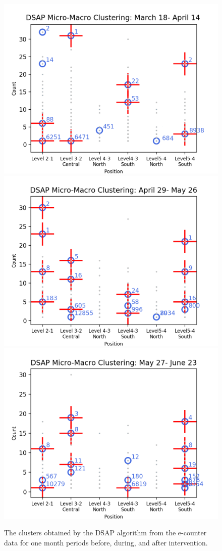\begin{figure}[!t]
    \centering
    \includegraphics[width=.47\textwidth]{image/Chapters/Chapter6/BeforeInte1month.png}
    \includegraphics[width=.47\textwidth]{image/Chapters/Chapter6/duringInte1month.png}
    \includegraphics[width=.47\textwidth]{image/Chapters/Chapter6/afterInte1month.png}
    \caption{The clusters obtained by the DSAP algorithm from the e-counter data for one month periods before, during, and after intervention.}
    \label{dsap3mon}
\end{figure}








